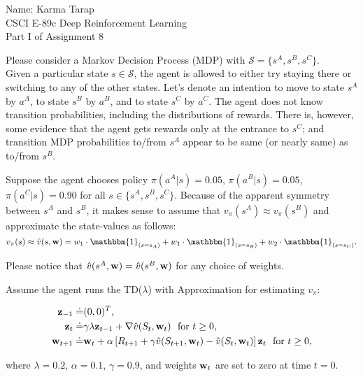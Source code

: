 \documentclass[12pt]{letter}
\begin{document}
\begin{flushleft}
{\sc Name: Karma Tarap}\\
CSCI E-89c Deep Reinforcement Learning\\
Part I of Assignment 8\\
\end{flushleft}

Please consider a Markov Decision Process (MDP) with  $\mathcal{S}=\{s^{A},s^{B},s^{C}\}$.\medskip\\
Given a particular state $s\in \mathcal{S}$, the agent is allowed to either try staying there or switching to any of the other states. Let's denote an intention to move to state $s^A$ by $a^A$, to state $s^B$ by $a^B$, and to state $s^C$ by $a^C$. The agent does not know transition probabilities, including the distributions of rewards. There is, however, some evidence that the agent gets rewards only at the entrance to $s^{C}$; and transition MDP probabilities to/from $s^{A}$ appear to be same (or nearly same) as to/from $s^{B}$. 

Suppose the agent chooses policy $\pi(a^A|s)=0.05$, $\pi(a^B|s)=0.05$, $\pi(a^C|s)=0.90$ for all $s\in\{s^A,s^B,s^C\}$. Because of the apparent symmetry between $s^A$ and $s^B$, it makes sense to assume that $v_\pi(s^A) \approx v_\pi(s^B)$ and approximate the state-values as follows:
$$v_\pi(s)\approx\hat{v}(s,{\bf w}) = w_1\cdot \mathbbm{1}_{(s=s_A)} + w_1\cdot \mathbbm{1}_{(s=s_B)} + w_2\cdot \mathbbm{1}_{(s=s_C)}.$$ 

Please notice that $\hat{v}(s^A,{\bf w})=\hat{v}(s^B,{\bf w})$ for any choice of weights.

Assume the agent runs the TD($\lambda$) with Approximation for estimating $v_\pi$:

\begin{equation*}
\begin{aligned}
{\bf z}_{-1} \doteq & (0,0)^T,\\
{\bf z}_t\doteq & \gamma \lambda {\bf z}_{t-1}+\nabla \hat{v}(S_t,{\bf w}_t) ~~\text{for}~ t\geq 0,\\
{\bf w}_{t+1}\doteq & {\bf w}_t+ \alpha \left[R_{t+1}+ \gamma \hat{v}(S_{t+1},{\bf w}_t) - \hat{v}(S_{t},{\bf w}_t)\right]{\bf z}_t ~~\text{for}~ t\geq 0,
\end{aligned}
\end{equation*}

where $\lambda=0.2$, $\alpha=0.1$, $\gamma=0.9$, and weights ${\bf w}_t$ are set to zero at time $t=0$.
\end{document}

